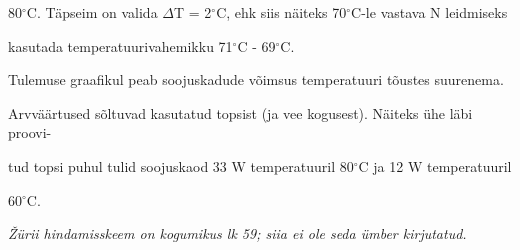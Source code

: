 80$^\circ$C. Täpseim on valida $\Delta$T = 2$^\circ$C, ehk siis näiteks 70$^\circ$C-le vastava N leidmiseks

kasutada temperatuurivahemikku 71$^\circ$C - 69$^\circ$C.

Tulemuse graafikul peab soojuskadude võimsus temperatuuri tõustes suurenema.

Arvväärtused sõltuvad kasutatud topsist (ja vee kogusest). Näiteks ühe läbi proovi-

tud topsi puhul tulid soojuskaod 33 W temperatuuril 80$^\circ$C ja 12 W temperatuuril

60$^\circ$C.

\textit{Žürii hindamisskeem on kogumikus lk 59; siia ei ole seda ümber kirjutatud.}
\probend
